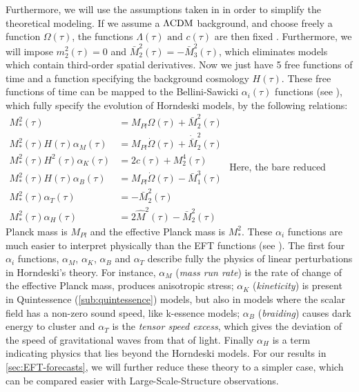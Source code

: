 Furthermore, we will use the assumptions taken in \cite{planck_collaboration_planck_2016} in order to simplify
the theoretical modeling.
If we assume a $\Lambda\mathrm{CDM}$ background, and choose freely a function
$\Omega(\tau)$, the functions $\Lambda(\tau) \textrm{ and } c(\tau)$ are then fixed \cite{cite Hu 2014}.
Furthermore, we will impose $ m^2_2(\tau) = 0$ and $ \bar{M}_2^2 (\tau) = - \bar{M}_3^2 (\tau)$,
which eliminates models which contain third-order spatial derivatives.
Now we just have 5 free functions of time and a function specifying the background cosmology $H(\tau)$.
These free functions of time can be mapped to the Bellini-Sawicki $\alpha_i (\tau)$ 
functions (see \cite{bellini-sawicki}),
which fully specify the evolution of Horndeski models, by the following relations:
\beeqal$
\begin{split}
M_{*}^2 (\tau) & = M_{Pl}\Omega(\tau) + \bar{M}_2^2 (\tau) \\
M_{*}^2 (\tau) H(\tau) \alpha_M (\tau)   & = M_{Pl}\dot{\Omega}(\tau) + \dot{\bar{M}}_2^2 (\tau) \\
M_{*}^2 (\tau) H^2(\tau) \alpha_K (\tau)   & = 2 c (\tau) + M_2^4 (\tau) \\
M_{*}^2 (\tau) H(\tau) \alpha_B (\tau)   & = M_{Pl}\dot{\Omega}(\tau) - \bar{M}_{1}^3 (\tau)\\
M_{*}^2 (\tau) \alpha_T (\tau)   & = - \bar{M}_2^2 (\tau) \\
M_{*}^2 (\tau) \alpha_H (\tau)   & = 2 \hat{M}^2(\tau) - \bar{M}_2^2 (\tau)
\end{split}
$ 
Here, the bare reduced Planck mass is $M_{Pl}$ and the effective Planck mass is $ M_{*}^2 $.
These $\alpha_i$ functions are much easier to interpret physically than the EFT functions (see \cite{bellini, sawicki}).
The first four $\alpha_i$ functions, $\alpha_M$, $\alpha_K$,
$\alpha_B$ and $\alpha_T$  describe fully the physics
of linear perturbations in Horndeski's theory.
For instance, $\alpha_M$ (\emph{mass run rate}) is the rate of change of the effective Planck mass, 
produces anisotropic stress; $\alpha_K$ (\emph{kineticity}) is present in Quintessence (\cref{sub:quintessence}) models, 
but also in models where the scalar field has a non-zero sound speed, like k-essence models;
$\alpha_B$ (\emph{braiding}) causes dark energy to cluster and $\alpha_T$ is the \emph{tensor speed excess}, which gives the deviation
of the speed of gravitational waves from that of light.
Finally $\alpha_H$ is a term indicating physics that lies beyond the Horndeski models. 
For our results in \cref{sec:EFT-forecasts}, we will further reduce these theory to a simpler case, 
which can be compared easier with Large-Scale-Structure observations.


